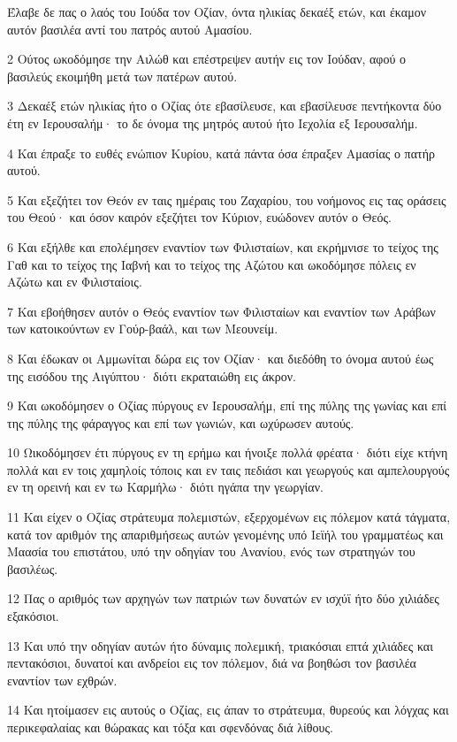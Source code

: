 \par Έλαβε δε πας ο λαός του Ιούδα τον Οζίαν, όντα ηλικίας δεκαέξ ετών, και έκαμον αυτόν βασιλέα αντί του πατρός αυτού Αμασίου.
\par 2 Ούτος ωκοδόμησε την Αιλώθ και επέστρεψεν αυτήν εις τον Ιούδαν, αφού ο βασιλεύς εκοιμήθη μετά των πατέρων αυτού.
\par 3 Δεκαέξ ετών ηλικίας ήτο ο Οζίας ότε εβασίλευσε, και εβασίλευσε πεντήκοντα δύο έτη εν Ιερουσαλήμ· το δε όνομα της μητρός αυτού ήτο Ιεχολία εξ Ιερουσαλήμ.
\par 4 Και έπραξε το ευθές ενώπιον Κυρίου, κατά πάντα όσα έπραξεν Αμασίας ο πατήρ αυτού.
\par 5 Και εξεζήτει τον Θεόν εν ταις ημέραις του Ζαχαρίου, του νοήμονος εις τας οράσεις του Θεού· και όσον καιρόν εξεζήτει τον Κύριον, ευώδονεν αυτόν ο Θεός.
\par 6 Και εξήλθε και επολέμησεν εναντίον των Φιλισταίων, και εκρήμνισε το τείχος της Γαθ και το τείχος της Ιαβνή και το τείχος της Αζώτου και ωκοδόμησε πόλεις εν Αζώτω και εν Φιλισταίοις.
\par 7 Και εβοήθησεν αυτόν ο Θεός εναντίον των Φιλισταίων και εναντίον των Αράβων των κατοικούντων εν Γούρ-βαάλ, και των Μεουνείμ.
\par 8 Και έδωκαν οι Αμμωνίται δώρα εις τον Οζίαν· και διεδόθη το όνομα αυτού έως της εισόδου της Αιγύπτου· διότι εκραταιώθη εις άκρον.
\par 9 Και ωκοδόμησεν ο Οζίας πύργους εν Ιερουσαλήμ, επί της πύλης της γωνίας και επί της πύλης της φάραγγος και επί των γωνιών, και ωχύρωσεν αυτούς.
\par 10 Ωικοδόμησεν έτι πύργους εν τη ερήμω και ήνοιξε πολλά φρέατα· διότι είχε κτήνη πολλά και εν τοις χαμηλοίς τόποις και εν ταις πεδιάσι και γεωργούς και αμπελουργούς εν τη ορεινή και εν τω Καρμήλω· διότι ηγάπα την γεωργίαν.
\par 11 Και είχεν ο Οζίας στράτευμα πολεμιστών, εξερχομένων εις πόλεμον κατά τάγματα, κατά τον αριθμόν της απαριθμήσεως αυτών γενομένης υπό Ιεϊήλ του γραμματέως και Μαασία του επιστάτου, υπό την οδηγίαν του Ανανίου, ενός των στρατηγών του βασιλέως.
\par 12 Πας ο αριθμός των αρχηγών των πατριών των δυνατών εν ισχύϊ ήτο δύο χιλιάδες εξακόσιοι.
\par 13 Και υπό την οδηγίαν αυτών ήτο δύναμις πολεμική, τριακόσιαι επτά χιλιάδες και πεντακόσιοι, δυνατοί και ανδρείοι εις τον πόλεμον, διά να βοηθώσι τον βασιλέα εναντίον των εχθρών.
\par 14 Και ητοίμασεν εις αυτούς ο Οζίας, εις άπαν το στράτευμα, θυρεούς και λόγχας και περικεφαλαίας και θώρακας και τόξα και σφενδόνας διά λίθους.
